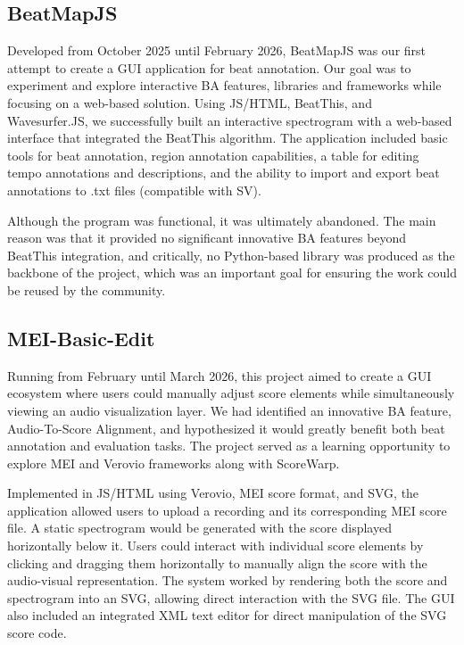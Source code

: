 \subsection{BeatMapJS}
Developed from October 2025 until February 2026, BeatMapJS was our first attempt to create a \ac{GUI} application for beat annotation. Our goal was to experiment and explore interactive \ac{BA} features, libraries and frameworks while focusing on a web-based solution. Using \ac{JS}/\ac{HTML}, BeatThis, and Wavesurfer.JS, we successfully built an interactive spectrogram with a web-based interface that integrated the BeatThis algorithm. The application included basic tools for beat annotation, region annotation capabilities, a table for editing tempo annotations and descriptions, and the ability to import and export beat annotations to .txt files (compatible with \ac{SV}).

Although the program was functional, it was ultimately abandoned. The main reason was that it provided no significant innovative \ac{BA} features beyond BeatThis integration, and critically, no Python-based library was produced as the backbone of the project, which was an important goal for ensuring the work could be reused by the community.

\subsection{MEI-Basic-Edit}
Running from February until March 2026, this project aimed to create a \ac{GUI} ecosystem where users could manually adjust score elements while simultaneously viewing an audio visualization layer. We had identified an innovative \ac{BA} feature, Audio-To-Score Alignment, and hypothesized it would greatly benefit both beat annotation and evaluation tasks. The project served as a learning opportunity to explore \ac{MEI} and Verovio frameworks along with ScoreWarp.

Implemented in \ac{JS}/\ac{HTML} using Verovio, \ac{MEI} score format, and \ac{SVG}, the application allowed users to upload a recording and its corresponding \ac{MEI} score file. A static spectrogram would be generated with the score displayed horizontally below it. Users could interact with individual score elements by clicking and dragging them horizontally to manually align the score with the audio-visual representation. The system worked by rendering both the score and spectrogram into an \ac{SVG}, allowing direct interaction with the \ac{SVG} file. The \ac{GUI} also included an integrated \ac{XML} text editor for direct manipulation of the \ac{SVG} score code.

